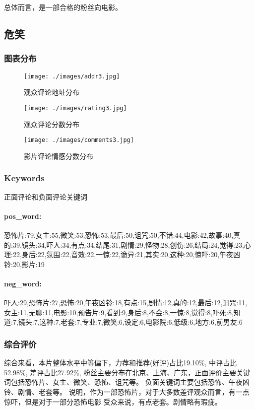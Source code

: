 \documentclass[12pt]{article}
\begin{document}
总体而言，是一部合格的粉丝向电影。

\subsection*{危笑}
\subsubsection*{图表分布}
\begin{figure}[H]
    \centering
    \begin{minipage}[t]{0.48\textwidth}
    \centering
    \texttt{[image: ./images/addr3.jpg]}
    \caption{观众评论地址分布}
    \end{minipage}
    \begin{minipage}[t]{0.48\textwidth}
    \centering
    \texttt{[image: ./images/rating3.jpg]}
    \caption{观众评论分数分布}
    \end{minipage}
\end{figure}

\begin{figure}[H]
    \centering
    \texttt{[image: ./images/comments3.jpg]}
    \caption{影片评论情感分数分布} 
\end{figure}
\subsubsection*{Keywords}
正面评论和负面评论关键词
\paragraph*{pos\_word:}
恐怖片:79,女主:55,微笑:53,恐怖:53,最后:50,诅咒:50,不错:44,电影:42,故事:40,真的:39,镜头:34,吓人:34,有点:34,结尾:31,剧情:29,怪物:28,创伤:26,结局:24,觉得:23,心理:22,身后:22,氛围:22,音效:22,一惊:22,诡异:21,其实:20,这种:20,惊吓:20,午夜凶铃:20,影片:19
\paragraph*{neg\_word:}
吓人:29,恐怖片:27,恐怖:20,午夜凶铃:18,有点:15,剧情:12,真的:12,最后:12,诅咒:11,女主:11,无聊:11,电影:10,预告片:9,看到:9,身后:8,不会:8,一惊:8,觉得:8,吓死:8,知道:7,镜头:7,这种:7,老套:7,专业:7,微笑:6,设定:6,电影院:6,低级:6,地方:6,前男友:6
\subsubsection*{综合评价}
综合来看，本片整体水平中等偏下，力荐和推荐(好评)占比19.10\%,
中评占比52.98\%, 差评占比27.92\%, 粉丝主要分布在北京、上海、广东，正面评价主要关键词包括恐怖片、女主、微笑、恐怖、诅咒等。
负面关键词主要包括恐怖、午夜凶铃、剧情、老套等。
说明，作为一部恐怖片，对于大多数差评观众而言，有一点惊吓，但是对于一部分恐怖电影
受众来说，有点老套。剧情略有瑕疵。
\end{document}
